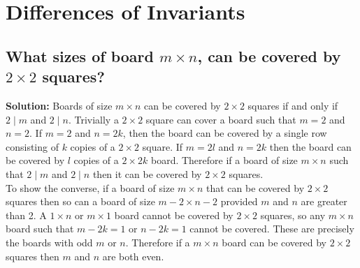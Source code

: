 \documentclass{article}
\newcommand{\exercise}[1]{\subsection{\normalfont #1}}
\newcommand{\solution}{\indent\indent \textbf{Solution: }}
\begin{document}
\section{Differences of Invariants}
\exercise{What sizes of board $m\times n$, can be covered by $2\times 2$ squares?}
\solution 
Boards of size $m\times n$ can be covered by $2\times 2$ squares if and only if $2\mid m$ and $2\mid n$. Trivially a $2\times 2$ square can cover a board such that $m=2$ and $n=2$. If $m=2$ and $n=2k$, then the board can be covered by a single row consisting of $k$ copies of a $2\times 2$ square. If $m=2l$ and $n=2k$ then the board can be covered by $l$ copies of a $2\times 2k$ board. Therefore if a board of size $m\times n$ such that $2 \mid m$ and $2 \mid n$ then it can be covered by $2\times 2$ squares. \\
\indent To show the converse, if a board of size $m\times n$ that can be covered by $2\times 2$ squares then so can a board of size $m-2\times n-2$ provided $m$ and $n$ are greater than 2. A $1\times n$ or $m\times 1$ board cannot be covered by $2\times 2$ squares, so any $m\times n$ board such that $m-2k =1$ or $n-2k = 1$ cannot be covered. These are precisely the boards with odd $m$ or $n$. Therefore if a $m\times n$ board can be covered by $2\times 2$ squares then $m$ and $n$ are both even. 
\end{document}
